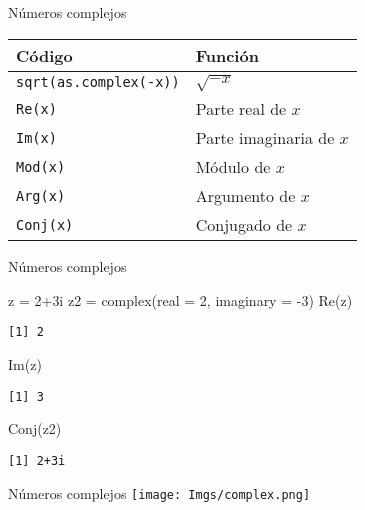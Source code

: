 \documentclass[
  ignorenonframetext,
]{beamer}
\newenvironment{Shaded}{\begin{snugshade}}{\end{snugshade}}
\newcommand{\AttributeTok}[1]{\textcolor[rgb]{0.77,0.63,0.00}{#1}}
\newcommand{\DecValTok}[1]{\textcolor[rgb]{0.00,0.00,0.81}{#1}}
\newcommand{\FunctionTok}[1]{\textcolor[rgb]{0.00,0.00,0.00}{#1}}
\newcommand{\NormalTok}[1]{#1}
\newcommand{\OtherTok}[1]{\textcolor[rgb]{0.56,0.35,0.01}{#1}}
\newcommand{\SpecialCharTok}[1]{\textcolor[rgb]{0.00,0.00,0.00}{#1}}
\begin{document}
\begin{frame}[fragile]{Números complejos}
\protect\hypertarget{nuxfameros-complejos-1}{}
\begin{longtable}[]{@{}ll@{}}
\toprule
Código & Función \\
\midrule
\endhead
\texttt{sqrt(as.complex(-x))} & \(\sqrt{-x}\) \\
\texttt{Re(x)} & Parte real de \(x\) \\
\texttt{Im(x)} & Parte imaginaria de \(x\) \\
\texttt{Mod(x)} & Módulo de \(x\) \\
\texttt{Arg(x)} & Argumento de \(x\) \\
\texttt{Conj(x)} & Conjugado de \(x\) \\
\bottomrule
\end{longtable}
\end{frame}

\begin{frame}[fragile]{Números complejos}
\protect\hypertarget{nuxfameros-complejos-2}{}
\begin{Shaded}
\begin{Highlighting}[]
\NormalTok{z }\OtherTok{=} \DecValTok{2}\SpecialCharTok{+}\NormalTok{3i}
\NormalTok{z2 }\OtherTok{=} \FunctionTok{complex}\NormalTok{(}\AttributeTok{real =} \DecValTok{2}\NormalTok{, }\AttributeTok{imaginary =} \SpecialCharTok{{-}}\DecValTok{3}\NormalTok{)}
\FunctionTok{Re}\NormalTok{(z)}
\end{Highlighting}
\end{Shaded}

\begin{verbatim}
[1] 2
\end{verbatim}

\begin{Shaded}
\begin{Highlighting}[]
\FunctionTok{Im}\NormalTok{(z)}
\end{Highlighting}
\end{Shaded}

\begin{verbatim}
[1] 3
\end{verbatim}

\begin{Shaded}
\begin{Highlighting}[]
\FunctionTok{Conj}\NormalTok{(z2)}
\end{Highlighting}
\end{Shaded}

\begin{verbatim}
[1] 2+3i
\end{verbatim}
\end{frame}

\begin{frame}{Números complejos}
\protect\hypertarget{nuxfameros-complejos-3}{}
\texttt{[image: Imgs/complex.png]}
\end{frame}
\end{document}
